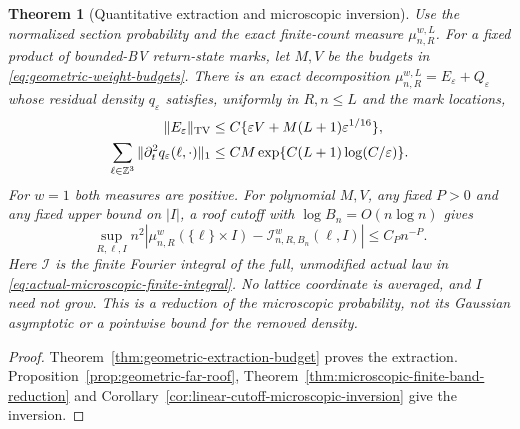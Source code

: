 \documentclass[11pt,reqno]{amsart}
\numberwithin{equation}{section}
\newtheorem{maintheorem}{Theorem}
\theoremstyle{definition}\newtheorem{definition}[theorem]{Definition}
\theoremstyle{remark}\newtheorem{remark}[theorem]{Remark}
\begin{document}
\begin{maintheorem}[Quantitative extraction and microscopic inversion]
\label{thm:intro-geometric-raw-reduction}
Use the normalized section probability and the exact finite-count
measure $\mu_{n,R}^{w,L}$. For a fixed product of bounded-BV return-state
marks, let $M,V$ be the budgets in \eqref{eq:geometric-weight-budgets}.
There is an exact decomposition $\mu_{n,R}^{w,L}=E_\varepsilon+Q_\varepsilon$
whose residual density $q_\varepsilon$ satisfies, uniformly in $R,n\le L$
and the mark locations,
\begin{align*}
 \|E_\varepsilon\|_{\operatorname{TV}}
    &\le C\{\varepsilon V+M(L+1)\varepsilon^{1/16}\},\\
 \sum_{\ell\in\mathbb Z^3}\|\partial_t^2q_\varepsilon(\ell,\cdot)\|_1
    &\le CM\exp\{C(L+1)\log(C/\varepsilon)\}.
\end{align*}
For $w=1$ both measures are positive. For polynomial $M,V$, any fixed
$P>0$ and any fixed upper bound on $|I|$, a roof cutoff with
$\log B_n=O(n\log n)$ gives
\[
 \sup_{R,\ell,I}n^2\left|
 \mu_{n,R}^w(\{\ell\}\times I)
       -\mathcal I_{n,R,B_n}^{w}(\ell,I)\right|\le C_Pn^{-P}.
\]
Here $\mathcal I$ is the finite Fourier integral of the full, unmodified
actual law in \eqref{eq:actual-microscopic-finite-integral}. No lattice
coordinate is averaged, and $I$ need not grow. This is a reduction of
the microscopic probability, not its Gaussian asymptotic or a pointwise
bound for the removed density.
\end{maintheorem}
\begin{proof}
Theorem~\ref{thm:geometric-extraction-budget} proves the extraction.
Proposition~\ref{prop:geometric-far-roof},
Theorem~\ref{thm:microscopic-finite-band-reduction} and
Corollary~\ref{cor:linear-cutoff-microscopic-inversion} give the inversion.
\end{proof}
\end{document}
